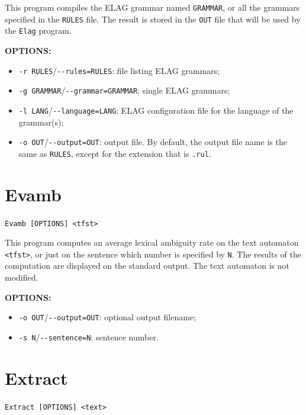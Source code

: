 \bigskip
\noindent This program compiles the ELAG grammar named \verb+GRAMMAR+, or all
the grammars specified in the \verb+RULES+ file. The result is stored in the
\verb+OUT+ file that will be used by the \verb+Elag+ program.

\bigskip
\noindent \textbf{OPTIONS:}
\begin{itemize}
  \item \verb+-r RULES+/\verb+--rules=RULES+: file listing ELAG grammars;
  \item \verb+-g GRAMMAR+/\verb+--grammar=GRAMMAR+: single ELAG grammars;
  \item \verb+-l LANG+/\verb+--language=LANG+: ELAG configuration file for the language of the grammar(s);
  \item \verb+-o OUT+/\verb+--output=OUT+: output file. By default, the output file name is 
        the same as \verb+RULES+, except for the extension that is
        \verb+.rul+.
\end{itemize}








\section{Evamb}
\verb+Evamb [OPTIONS] <tfst>+

\bigskip
\noindent This program computes an average lexical ambiguity rate on the text
automaton \verb+<tfst>+, or just on the sentence which number is specified by
\verb+N+. The results of the computation are displayed on the standard output.
The text automaton is not modified.

\bigskip
\noindent \textbf{OPTIONS:}
\begin{itemize}
  \item \verb+-o OUT+/\verb+--output=OUT+: optional output filename;
  \item \verb+-s N+/\verb+--sentence=N+: sentence number.
\end{itemize}








\section{Extract}
\verb+Extract [OPTIONS] <text>+

